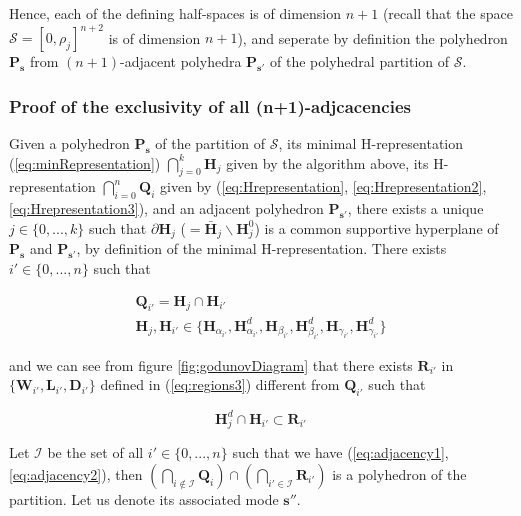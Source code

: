 \noindent Hence, each of the defining half-spaces is of dimension $n+1$ \cite{Gruenbaum2003} (recall that the space $\mathcal{S} = [0,\rho_{j}]^{n+2}$ is of dimension $n+1$), and seperate by definition the polyhedron $\textbf{P}_{\boldsymbol s}$ from $(n+1)$-adjacent polyhedra $\textbf{P}_{\boldsymbol s'}$ of the polyhedral partition of $\mathcal{S}$.


\subsubsection{Proof of the exclusivity of all (n+1)-adjcacencies}\label{sec:adjacency}

Given a polyhedron $\textbf{P}_{\boldsymbol s}$ of the partition of $\mathcal{S}$, its minimal H-representation (\ref{eq:minRepresentation}) $\bigcap_{j=0}^{k} \textbf{H}_{j}$ given by the algorithm above, its H-representation $\bigcap_{i=0}^{n} \textbf{Q}_{i}$ given by (\ref{eq:Hrepresentation}, \ref{eq:Hrepresentation2}, \ref{eq:Hrepresentation3}), and an adjacent polyhedron $\textbf{P}_{\boldsymbol s'}$, there exists a unique $j\in\{0,...,k\}$ such that $\partial \textbf{H}_{j}$ ($=\bar{\textbf{H}}_{j} \backslash \textbf{H}^{0}_{j}$) is a common supportive hyperplane of $\textbf{P}_{\boldsymbol s}$ and $\textbf{P}_{\boldsymbol s'}$, by definition of the minimal H-representation. There exists $i'\in\{0,...,n\}$ such that

\begin{equation}
\begin{array}{l}
\textbf{Q}_{i'}=\textbf{H}_{j}\cap \textbf{H}_{i'}\\
\textbf{H}_{j}, \textbf{H}_{i'}\in \{\textbf{H}_{\alpha_{i'}}, \textbf{H}^{d}_{\alpha_{i'}}, \textbf{H}_{\beta_{i'}}, \textbf{H}^{d}_{\beta_{i'}}, \textbf{H}_{\gamma_{i'}}, \textbf{H}^{d}_{\gamma_{i'}}\}
\end{array}
\label{eq:adjacency1}
\end{equation}

\noindent and we can see from figure \ref{fig:godunovDiagram} that there exists $\textbf{R}_{i'}$ in $\{\textbf{W}_{i'}, \textbf{L}_{i'}, \textbf{D}_{i'}\}$ defined in (\ref{eq:regions3}) different from $\textbf{Q}_{i'}$ such that

\begin{equation}
\textbf{H}^{d}_{j}\cap \textbf{H}_{i'}\subset \textbf{R}_{i'}
\label{eq:adjacency2}
\end{equation}

\noindent Let $\mathcal{I}$ be the set of all $i'\in\{0,...,n\}$ such that we have (\ref{eq:adjacency1}, \ref{eq:adjacency2}), then $(\bigcap_{i\notin \mathcal{I}} \textbf{Q}_{i})\cap (\bigcap_{i'\in\mathcal{I}}\textbf{R}_{i'})$ is a polyhedron of the partition. Let us denote its associated mode $\boldsymbol s''$.

